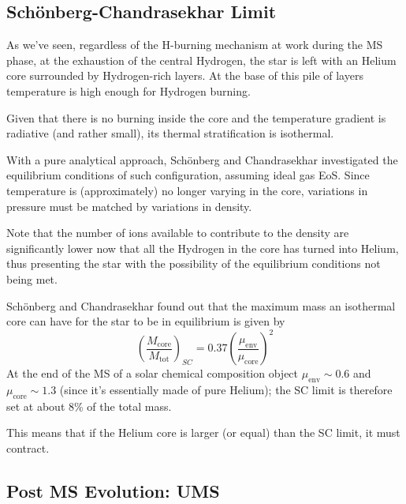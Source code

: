 \subsection{Schönberg-Chandrasekhar Limit}

As we've seen, regardless of the H-burning mechanism at work during the MS phase, at the exhaustion of the central Hydrogen, the star is left with an Helium core surrounded by Hydrogen-rich layers. At the base of this pile of layers temperature is high enough for Hydrogen burning.
\par Given that there is no burning inside the core and the temperature gradient is radiative (and rather small), its thermal stratification is isothermal.
\par With a pure analytical approach, Schönberg and Chandrasekhar investigated the equilibrium conditions of such configuration, assuming ideal gas EoS. Since temperature is (approximately) no longer varying in the core, variations in pressure must be matched by variations in density.
\par Note that the number of ions available to contribute to the density are significantly lower now that all the Hydrogen in the core has turned into Helium, thus presenting the star with the possibility of the equilibrium conditions not being met.
\par Schönberg and Chandrasekhar found out that the maximum mass an isothermal core can have for the star to be in equilibrium is given by
\begin{equation}
    \left(\frac{M_{\text{core}}}{M_{\text{tot}}}\right)_{SC} = 0.37\left(\frac{\mu_{\text{env}}}{\mu_{\text{core}}}\right)^{2}
    \label{eq:sc_masslimit}
\end{equation}
At the end of the MS of a solar chemical composition object $\mu_{\text{env}}\sim 0.6$ and $\mu_{\text{core}}\sim 1.3$ (since it's essentially made of pure Helium); the SC limit is therefore set at about 8\% of the total mass.
\par This means that if the Helium core is larger (or equal) than the SC limit, it must contract.

\subsection{Post MS Evolution: UMS}

